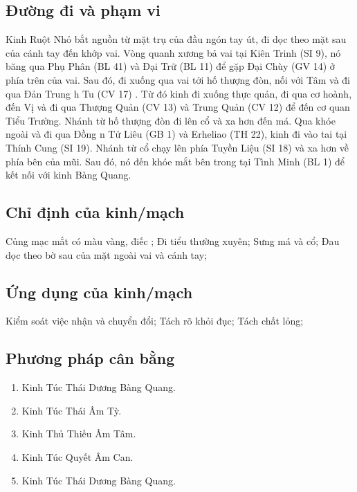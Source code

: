 \documentclass[12pt,a4paper]{article}
\begin{document}
\subsection*{Đường đi và phạm vi}Kinh Ruột Nhỏ bắt nguồn từ mặt trụ của đầu ngón tay út, đi dọc theo mặt sau của cánh tay đến khớp vai. Vòng quanh xương bả vai tại Kiên Trinh (SI 9), nó băng qua Phụ Phân (BL 41) và Đại Trữ (BL 11) để gặp Đại Chùy (GV 14) ở phía trên của vai. Sau đó, đi xuống qua vai tới hố thượng đòn, nối với Tâm và đi qua Đản Trung h Tu (CV 17) . Từ đó kinh đi xuống thực quản, đi qua cơ hoành, đến Vị và đi qua Thượng Quản (CV 13) và Trung Quản (CV 12) để đến cơ quan Tiểu Trường. Nhánh từ hố thượng đòn đi lên cổ và xa hơn đến má. Qua khóe ngoài và đi qua Đồng n Tử Liêu (GB 1) và Erheliao (TH 22), kinh đi vào tai tại Thính Cung (SI 19). Nhánh từ cổ chạy lên phía Tuyền Liệu (SI 18) và xa hơn về phía bên của mũi. Sau đó, nó đến khóe mắt bên trong tại Tình Minh (BL 1) để kết nối với kinh Bàng Quang.
\subsection*{Chỉ định của kinh/mạch}Củng mạc mắt có màu vàng, điếc ; Đi tiểu thường xuyên; Sưng má và cổ; Đau dọc theo bờ sau của mặt ngoài vai và cánh tay;
\subsection*{Ứng dụng của kinh/mạch}Kiểm soát việc nhận và chuyển đổi; Tách rõ khỏi đục; Tách chất lỏng;
\subsection*{Phương pháp cân bằng}
\begin{enumerate}
\item Kinh Túc Thái Dương Bàng Quang.
\item Kinh Túc Thái Âm Tỳ.
\item Kinh Thủ Thiếu Âm Tâm.
\item Kinh Túc Quyết Âm Can.
\item Kinh Túc Thái Dương Bàng Quang.
\end{enumerate}
\end{document}
